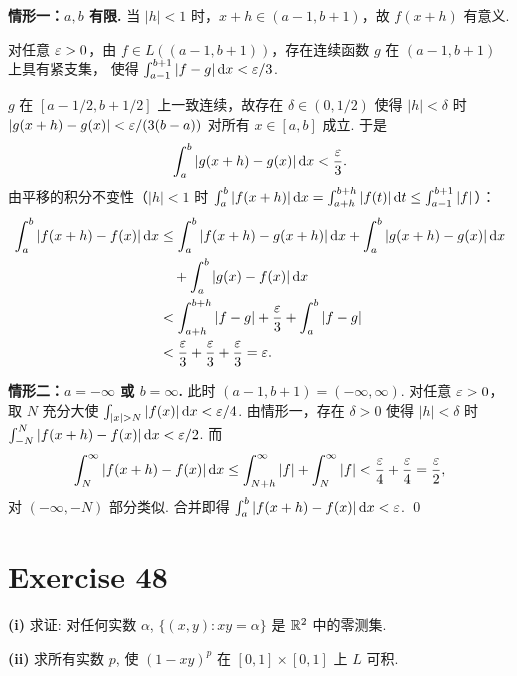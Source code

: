 \documentclass{article}
\begin{document}
\begin{solution}
  \textbf{情形一：$a, b$ 有限.}\quad
  当 $|h| < 1$ 时，$x + h \in (a-1, b+1)$，故 $f(x+h)$ 有意义.

  对任意 $\varepsilon > 0$，由 $f \in L((a-1,b+1))$，存在连续函数 $g$ 在 $(a-1,b+1)$ 上具有紧支集，
  使得 $\int_{a-1}^{b+1} |f - g|\,\mathrm{d} x < \varepsilon/3$.

  $g$ 在 $[a-1/2, b+1/2]$ 上一致连续，故存在 $\delta \in (0, 1/2)$ 使得 $|h| < \delta$ 时
  $|g(x+h) - g(x)| < \varepsilon/(3(b-a))$ 对所有 $x \in [a, b]$ 成立. 于是
  \[
    \int_a^b |g(x+h) - g(x)|\,\mathrm{d} x < \frac{\varepsilon}{3}.
  \]
  由平移的积分不变性（$|h| < 1$ 时 $\int_a^b |f(x+h)|\,\mathrm{d} x = \int_{a+h}^{b+h} |f(t)|\,\mathrm{d} t \le \int_{a-1}^{b+1} |f|$）：
  \begin{align*}
    \int_a^b |f(x+h) - f(x)|\,\mathrm{d} x
    &\le \int_a^b |f(x+h) - g(x+h)|\,\mathrm{d} x + \int_a^b |g(x+h) - g(x)|\,\mathrm{d} x \\
    &\quad + \int_a^b |g(x) - f(x)|\,\mathrm{d} x \\
    &< \int_{a+h}^{b+h} |f - g| + \frac{\varepsilon}{3} + \int_a^b |f - g| \\
    &< \frac{\varepsilon}{3} + \frac{\varepsilon}{3} + \frac{\varepsilon}{3} = \varepsilon.
  \end{align*}

  \textbf{情形二：$a = -\infty$ 或 $b = \infty$.}\quad
  此时 $(a-1, b+1) = (-\infty, \infty)$.
  对任意 $\varepsilon > 0$，取 $N$ 充分大使 $\int_{|x| > N} |f(x)|\,\mathrm{d} x < \varepsilon/4$.
  由情形一，存在 $\delta > 0$ 使得 $|h| < \delta$ 时 $\int_{-N}^N |f(x+h)-f(x)|\,\mathrm{d} x < \varepsilon/2$.
  而
  \[
    \int_N^{\infty} |f(x+h)-f(x)|\,\mathrm{d} x \le \int_{N+h}^{\infty} |f| + \int_N^{\infty} |f| < \frac{\varepsilon}{4} + \frac{\varepsilon}{4} = \frac{\varepsilon}{2},
  \]
  对 $(-\infty, -N)$ 部分类似. 合并即得 $\int_a^b |f(x+h)-f(x)|\,\mathrm{d} x < \varepsilon$. \qed
\end{solution}

\section{Exercise 48}

\textbf{(i)} 求证: 对任何实数 $\alpha$, $\{(x, y) : xy = \alpha\}$ 是 $\mathbb{R}^2$ 中的零测集.

\textbf{(ii)} 求所有实数 $p$, 使 $(1 - xy)^p$ 在 $[0, 1] \times [0, 1]$ 上 $L$ 可积.
\end{document}
